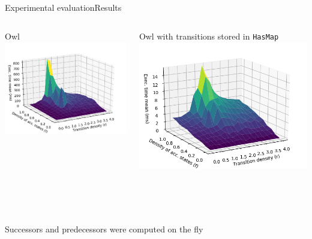 \documentclass[10pt]{beamer}
\begin{document}
\begin{frame}{Experimental evaluation}{Results}
  \begin{columns}[T]
   \begin{column}{.5\textwidth}
       \begin{block}{Owl}
       \includegraphics[scale=0.4]{img/defense/this-average-antichain}
       \end{block}
     \end{column}
     \begin{column}{.5\textwidth}
         \begin{block}{Owl with transitions stored in \texttt{HasMap}}
            \includegraphics[scale=0.4]{img/defense/with-hashmap-exp5}
         \end{block}
     \end{column}
 \end{columns}
 \\~\\~\\

Successors and predecessors were computed on the fly

\end{frame}
\end{document}
